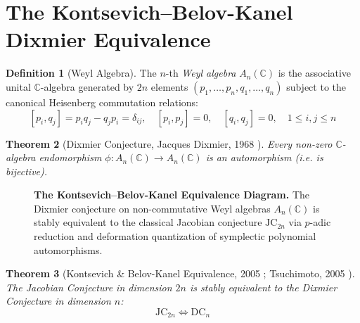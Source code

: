 \documentclass[11pt,a4paper]{article}
\newtheorem{theorem}{Theorem}[section]
\theoremstyle{definition}
\newtheorem{definition}[theorem]{Definition}
\begin{document}
\section{The Kontsevich--Belov-Kanel Dixmier Equivalence}

\begin{definition}[Weyl Algebra]\label{def:weyl_algebra}
The $n$-th \emph{Weyl algebra} $A_n(\mathbb{C})$ is the associative unital $\mathbb{C}$-algebra generated by $2n$ elements $(p_1, \dots, p_n, q_1, \dots, q_n)$ subject to the canonical Heisenberg commutation relations:
\begin{equation}\label{eq:weyl_comm}
[p_i, q_j] = p_i q_j - q_j p_i = \delta_{ij}, \quad [p_i, p_j] = 0, \quad [q_i, q_j] = 0, \quad 1 \le i, j \le n
\end{equation}
\end{definition}

\begin{theorem}[Dixmier Conjecture, Jacques Dixmier, 1968 \cite{dixmier1968}]\label{thm:dixmier_conj}
Every non-zero $\mathbb{C}$-algebra endomorphism $\phi: A_n(\mathbb{C}) \to A_n(\mathbb{C})$ is an automorphism (i.e. is bijective).
\end{theorem}

\begin{figure}[htbp]
\centering
{}
\caption{\textbf{The Kontsevich--Belov-Kanel Equivalence Diagram.} The Dixmier conjecture on non-commutative Weyl algebras $A_n(\mathbb{C})$ is stably equivalent to the classical Jacobian conjecture $\mathrm{JC}_{2n}$ via $p$-adic reduction and deformation quantization of symplectic polynomial automorphisms.}
\label{fig:dixmier_diagram}
\end{figure}

\begin{theorem}[Kontsevich \& Belov-Kanel Equivalence, 2005 \cite{belov2005}; Tsuchimoto, 2005 \cite{tsuchimoto2005}]\label{thm:kb_equiv}
The Jacobian Conjecture in dimension $2n$ is stably equivalent to the Dixmier Conjecture in dimension $n$:
\begin{equation}\label{eq:stable_equivalence}
\mathrm{JC}_{2n} \iff \mathrm{DC}_n
\end{equation}
\end{theorem}
\end{document}
